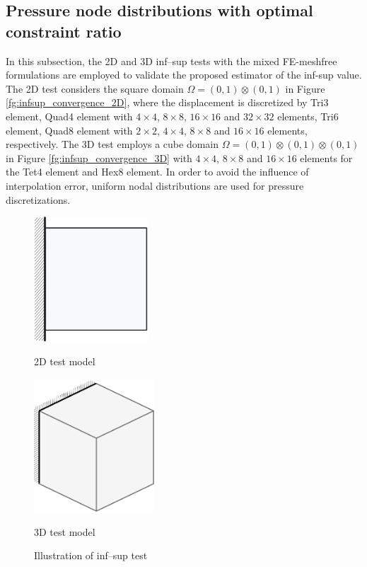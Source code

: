 \subsection{Pressure node distributions with optimal constraint ratio}

In this subsection, the 2D and 3D inf--sup tests \cite{chapelle1993} with the mixed FE-meshfree formulations are employed to validate the proposed estimator of the inf-sup value. The 2D test considers the square domain $\Omega = (0,1)\otimes (0,1)$ in Figure \ref{fg:infsup_convergence_2D}, where the displacement is discretized by Tri3 element, Quad4 element with $4\times 4$, $8\times 8$, $16\times 16$ and $32\times 32$ elements, Tri6 element, Quad8 element with $2\times 2$, $4\times 4$, $8\times 8$ and $16\times 16$ elements, respectively. The 3D test employs a cube domain $\Omega = (0,1)\otimes (0,1)\otimes (0,1)$ in Figure \ref{fg:infsup_convergence_3D} with $4\times 4$, $8\times 8$ and $16\times 16$ elements for the Tet4 element and Hex8 element. In order to avoid the influence of interpolation error, uniform nodal distributions are used for pressure discretizations.

\begin{figure}[H]
\centering
\begin{subcaptiongroup}
\parbox[b]{0.4\textwidth}{
\includegraphics[width=0.38\textwidth]{png/infsup_model.png}\caption{2D test model}\label{fg:infsup_convergence_2D}
}
\hspace{20pt}
\parbox[b]{0.4\textwidth}{
\includegraphics[width=0.4\textwidth]{png/inf_sup_block.png}\caption{3D test model}\label{fg:infsup_convergence_3D}
}
\end{subcaptiongroup}
\caption{Illustration of inf--sup test}\label{fg:inf_sup_test}
\end{figure}

